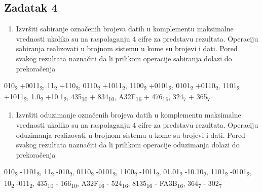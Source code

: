\documentclass[a4paper,11pt]{article}
\numberwithin{equation}{section}
\begin{document}
\subsection{Zadatak 4}\label{sec:2.4}


\begin{enumerate}[label=\alph*),start=1,leftmargin=*]
\item Izvršiti sabiranje označenih brojeva datih u komplementu maksimalne vrednosti ukoliko su na raspolaganju 4 cifre za predstavu rezultata. Operaciju sabiranja realizovati u brojnom sistemu u kome su brojevi i dati. Pored svakog rezultata naznačiti da li prilikom operacije sabiranja dolazi do prekoračenja

\end{enumerate}


010\textsubscript{2} +0011\textsubscript{2}, 11\textsubscript{2} +110\textsubscript{2}, 0110\textsubscript{2} +1011\textsubscript{2}, 1100\textsubscript{2} +0101\textsubscript{2}, 0101\textsubscript{2} +0110\textsubscript{2}, 1101\textsubscript{2} +1011\textsubscript{2}, 1.0\textsubscript{2} +10.1\textsubscript{2}, 435\textsubscript{10} + 834\textsubscript{10}, A32F\textsubscript{16} + 476\textsubscript{16}, 324\textsubscript{7} + 365\textsubscript{7}



\begin{enumerate}[label=\alph*),start=2,leftmargin=*]
\item Izvršiti oduzimanje označenih brojeva datih u komplementu maksimalne vrednosti ukoliko su na raspolaganju 4 cifre za predstavu rezultata. Operaciju oduzimanja realizovati u brojnom sistemu u kome su brojevi i dati. Pored svakog rezultata naznačiti da li prilikom operacije oduzimanja dolazi do prekoračenja

\end{enumerate}


010\textsubscript{2} -1101\textsubscript{2}, 11\textsubscript{2} -010\textsubscript{2}, 0110\textsubscript{2} -0101\textsubscript{2}, 1100\textsubscript{2} -1011\textsubscript{2}, 01.01\textsubscript{2} -10.10\textsubscript{2}, 1101\textsubscript{2} -0101\textsubscript{2}, 10\textsubscript{2} -011\textsubscript{2}, 435\textsubscript{10} - 166\textsubscript{10}, A32F\textsubscript{16} - 524\textsubscript{16}, 8135\textsubscript{16} - FA3B\textsubscript{16}, 364\textsubscript{7} - 302\textsubscript{7}
\end{document}
